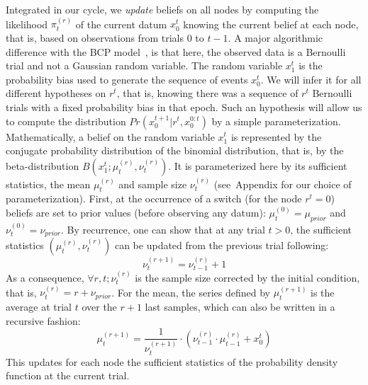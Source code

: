 \documentclass[10pt,letterpaper]{article}
\newcommand{\eql}[1]{\begin{equation}#1\end{equation}}
\newcommand{\citep}[1]{\cite{#1}}
\newcommand{\seeFig}[1]{Figure~\ref{fig:#1}}
\newcommand{\seeEq}[1]{Equation~\ref{eq:#1}}
\newcommand{\seeApp}[1]{Appendix}
\begin{document}
Integrated in our cycle, we \emph{update} beliefs on all nodes
by computing the likelihood $\pi^{(r)}_t$ of the current datum $x_0^{t}$
knowing the current belief at each node,
that is, based on observations from trials $0$ to $t-1$. %
A major algorithmic difference with the BCP model~\citep{AdamsMackay2007},
is that here, the observed data is a Bernoulli trial and not a Gaussian random variable.
The random variable $x_1^t$ is the probability bias used
to generate the sequence of events $x_0^t$.
We will infer it for all different hypotheses on $r^t$,
that is, knowing there was a sequence of $r^t$ Bernoulli trials
with a fixed probability bias in that epoch.
Such an hypothesis will allow us to compute the distribution
$Pr(x_0^{t+1} | r^{t}, x_0^{0:t})$
by a simple parameterization.
Mathematically, a belief on the random variable $x_1^t$ is represented
by the conjugate probability distribution of the binomial distribution,
that is, by the beta-distribution $B(x_1^t; \mu^{(r)}_{t}, \nu^{(r)}_{t})$.
It is parameterized here by its sufficient statistics,
the mean $\mu^{(r)}_{t}$ and sample size $\nu^{(r)}_{t}$ %
(see~\seeApp{beta} for our choice of parameterization).
First, at the occurrence of a switch (for the node $r^t=0$)
beliefs are set to prior values (before observing any datum):
$\mu^{(0)}_{t} = \mu_{prior}$ and $\nu^{(0)}_{t} = \nu_{prior}$.
By recurrence, %
one can show that at any trial $t>0$,
the sufficient statistics $(\mu^{(r)}_{t}, \nu^{(r)}_{t})$
can be updated from the previous trial following:
\eql{
\nu^{(r+1)}_{t} = \nu^{(r)}_{t-1} + 1
\label{eq:update_nu}
}
As a consequence, $\forall r, t; \nu^{(r)}_{t}$ is the sample size corrected by the initial condition, that is,
$\nu^{(r)}_{t} = r + \nu_{prior}$. For the mean, the series defined by $\mu^{(r+1)}_{t}$ is the average at trial $t$ over the $r+1$ last samples, which can also be written in a recursive fashion:
\eql{
\mu^{(r+1)}_{t} = \frac{1}{\nu^{(r+1)}_{t}} \cdot (\nu^{(r)}_{t-1} \cdot \mu^{(r)}_{t-1} +  x_0^{t})
\label{eq:update_mu}
}
This updates for each node the sufficient statistics of the probability density function at the current trial.
\end{document}
